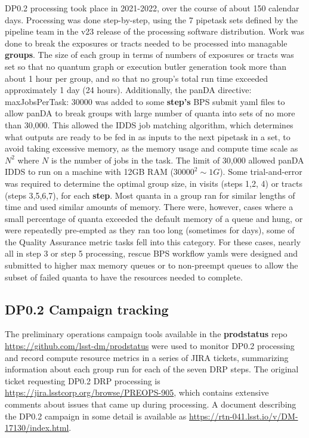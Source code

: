 \documentclass[OPS,authoryear,toc]{lsstdoc}
\begin{document}
DP0.2 processing took place in 2021-2022, over the course of about 150
calendar days.  Processing was done step-by-step, using the 7 pipetask
sets defined by the pipeline team in the v23 release of the processing
software distribution.  Work was done to break the exposures or tracts
needed to be processed into managable {\bf groups}.  The size of each
group in terms of numbers of exposures or tracts was set so that no
quantum graph or execution butler generation took more than about 1
hour per group, and so that no group's total run time exceeded
approximately 1 day (24 hours).  
Additionally, the panDA directive:
{\rm maxJobsPerTask: 30000} was added to some {\bf step's} BPS submit yaml
files to allow panDA to break groups with large number of quanta into
sets of no more than 30,000.  This allowed the IDDS job matching
algorithm, which determines what outputs are ready to be fed in as
inputs to the next pipetask in a set, to avoid taking excessive
memory, as the memory usage and compute time scale as $N^2$ where $N$
is the number of jobs in the task.  The limit of 30,000 allowed panDA
IDDS to run on a machine with 12GB RAM ($30000^2 \sim 1G$).  
Some trial-and-error was required to determine the optimal group 
size, in visits (steps 1,2, 4) or tracts (steps 3,5,6,7), for each {\bf step}.  
Most quanta in a group ran for similar lengths of time and used similar
amounts of memory.  There were, however, cases where a small percentage
of quanta exceeded the default memory of a queue and hung, or were repeatedly
pre-empted as they ran too long (sometimes for days), some of the Quality
Assurance metric tasks fell into this category.  For these
cases, nearly all in step 3 or step 5 processing, rescue BPS workflow
yamls were designed and submitted to higher max memory queues or 
to non-preempt queues to allow the subset of failed quanta to have the
resources needed to complete.

\subsection{DP0.2 Campaign tracking}

The preliminary operations campaign tools available in the {\bf
prodstatus} repo \url{https://github.com/lsst-dm/prodstatus} were
used to monitor DP0.2 processing and record compute resource metrics in 
a series of JIRA tickets, summarizing information about each group 
run for each of the seven DRP steps.   The original ticket 
requesting DP0.2 DRP processing is 
\url{https://jira.lsstcorp.org/browse/PREOPS-905}, which contains 
extensive comments about issues that came up during processing. 
A document describing the DP0.2 campaign in some detail is available 
as \url{https://rtn-041.lsst.io/v/DM-17130/index.html}.
\end{document}

